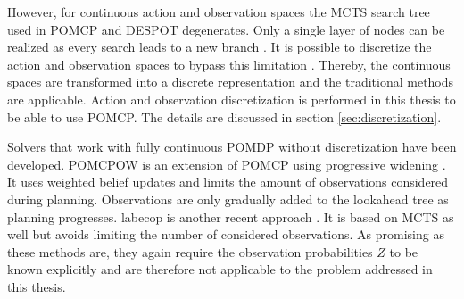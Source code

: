 However, for continuous action and observation spaces the MCTS search tree used in POMCP and DESPOT degenerates. Only a single layer of nodes can be realized as every search leads to a new branch \parencite{online_pomdp_cont}. It is possible to discretize the action and observation spaces to bypass this limitation \parencite{pomcp_continuous}. Thereby, the continuous spaces are transformed into a discrete representation and the traditional methods are applicable. Action and observation discretization is performed in this thesis to be able to use POMCP. The details are discussed in section \ref{sec:discretization}.

Solvers that work with fully continuous POMDP without discretization have been developed. POMCPOW is an extension of POMCP using progressive widening \parencite{online_pomdp_cont}. It uses weighted belief updates
and limits the amount of observations considered during planning. Observations are only gradually added to the lookahead tree as planning progresses. \gls{labecop} is another recent approach \parencite{online-cont-pomdp-2}. It is based on MCTS as well but avoids limiting the number of considered observations. As promising as these methods are, they again require the observation probabilities $Z$ to be known explicitly and are therefore not applicable to the problem addressed in this thesis.








